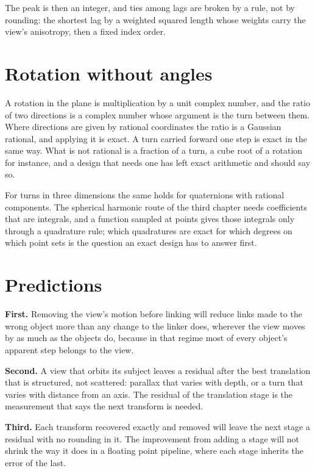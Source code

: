 The peak is then an integer, and ties among lags are broken by a rule, not by rounding: the shortest
lag by a weighted squared length whose weights carry the view's anisotropy, then a fixed index order.

\section{Rotation without angles}

A rotation in the plane is multiplication by a unit complex number, and the ratio of two directions
is a complex number whose argument is the turn between them. Where directions are given by rational
coordinates the ratio is a Gaussian rational, and applying it is exact. A turn carried forward one
step is exact in the same way. What is not rational is a fraction of a turn, a cube root of a
rotation for instance, and a design that needs one has left exact arithmetic and should say so.

For turns in three dimensions the same holds for quaternions with rational components. The spherical
harmonic route of the third chapter needs coefficients that are integrals, and a function sampled at
points gives those integrals only through a quadrature rule; which quadratures are exact for which
degrees on which point sets is the question an exact design has to answer first.

\section{Predictions}

\textbf{First.} Removing the view's motion before linking will reduce links made to the wrong object
more than any change to the linker does, wherever the view moves by as much as the objects do,
because in that regime most of every object's apparent step belongs to the view.

\textbf{Second.} A view that orbits its subject leaves a residual after the best translation that is
structured, not scattered: parallax that varies with depth, or a turn that varies with distance from
an axis. The residual of the translation stage is the measurement that says the next transform is
needed.

\textbf{Third.} Each transform recovered exactly and removed will leave the next stage a residual with
no rounding in it. The improvement from adding a stage will not shrink the way it does in a floating
point pipeline, where each stage inherits the error of the last.
